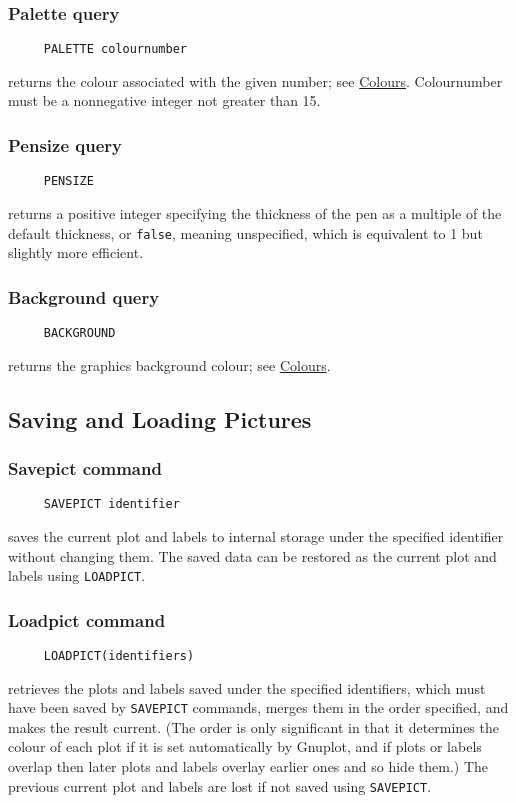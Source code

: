 \subsubsection*{Palette query}
\begin{verbatim}
     PALETTE colournumber
\end{verbatim}
returns the colour associated with the given number; see
\hyperref[logoturtle:Colours]{Colours}.  Colournumber must be a
nonnegative integer not greater than 15.

\subsubsection*{Pensize query}
\begin{verbatim}
     PENSIZE
\end{verbatim}
returns a positive integer specifying the thickness of the pen as a
multiple of the default thickness, or \texttt{false}, meaning
unspecified, which is equivalent to 1 but slightly more efficient.

\subsubsection*{Background query}
\begin{verbatim}
     BACKGROUND
\end{verbatim}
returns the graphics background colour; see
\hyperref[logoturtle:Colours]{Colours}.


\subsection{Saving and Loading Pictures}

\subsubsection*{Savepict command}
\begin{verbatim}
     SAVEPICT identifier
\end{verbatim}
\label{logoturtle:savepict}
saves the current plot and labels to internal storage under the
specified identifier without changing them.  The saved data can be
restored as the current plot and labels using \texttt{LOADPICT}.

\subsubsection*{Loadpict command}
\begin{verbatim}
     LOADPICT(identifiers)
\end{verbatim}
retrieves the plots and labels saved under the specified identifiers,
which must have been saved by \texttt{SAVEPICT} commands, merges them
in the order specified, and makes the result current. (The order is
only significant in that it determines the colour of each plot if it
is set automatically by Gnuplot, and if plots or labels overlap then
later plots and labels overlay earlier ones and so hide them.)  The
previous current plot and labels are lost if not saved using
\texttt{SAVEPICT}.
